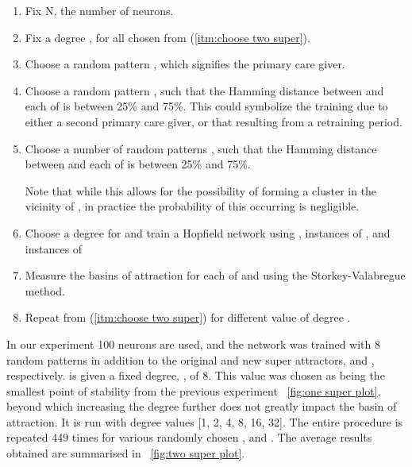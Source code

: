 \begin{enumerate}

\item Fix N, the number of neurons.

\item Fix a degree \dorigin, for all chosen \poriginsuper from (\ref{itm:choose two super}).

\item \label{itm:choose two super} Choose a random pattern \poriginsuper, which signifies the primary care giver.

\item Choose a random pattern \pnewsuper, such that the Hamming distance between \poriginsuper and each of \pnewsuper is between 25\% and 75\%. This could symbolize the training due to either a second primary care giver, or that resulting from a retraining period. 


\item Choose a number of random patterns \prandom, such that the Hamming distance between \poriginsuper and each of \prandom is between 25\% and 75\%.

Note that while this allows for the possibility of forming a cluster in the vicinity of \pnewsuper, in practice the probability of this occurring is negligible.


\item Choose a degree \dnew for \pnewsuper and train a Hopfield network using \prandom, \dorigin instances of \poriginsuper, and \dnew instances of \pnewsuper

\item Measure the basins of attraction for each of \poriginsuper and \pnewsuper using the Storkey-Valabregue method. 

\item Repeat from (\ref{itm:choose two super}) for different value of degree \dnew.

\end{enumerate}

In our experiment 100 neurons are used, and the network was trained with 8 random patterns in addition to the original and new super attractors, \poriginsuper and \pnewsuper, respectively. \poriginsuper is given a fixed degree, \dorigin, of 8. This value was chosen as being the smallest point of stability from the previous experiment ~\ref{fig:one super plot}, beyond which increasing the degree further does not greatly impact the basin of attraction. It is run with \dnew degree values {[}1, 2, 4, 8, 16, 32{]}. The entire procedure is repeated 449  times for various randomly chosen \poriginsuper, \pnewsuper and \prandom. The average results obtained are summarised in ~\ref{fig:two super plot}.

